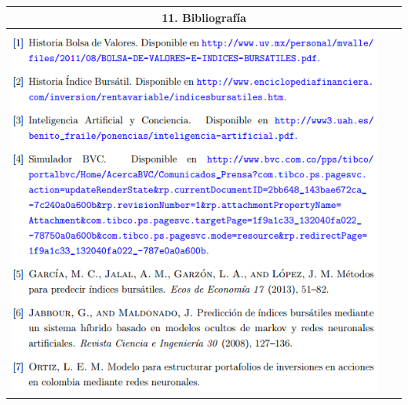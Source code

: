 \documentclass[letter,12pt]{article}
\begin{document}
\begin{center}
\begin{tabular}{|p{15.5cm}|}
\hline
\multicolumn{1}{|c|}{ \textbf{11. Bibliografía}}\\
\hline
\\
\includegraphics[width=0.95\textwidth]{ref.png}
\\
\hline
\end{tabular}
\end{center}
\end{document}
